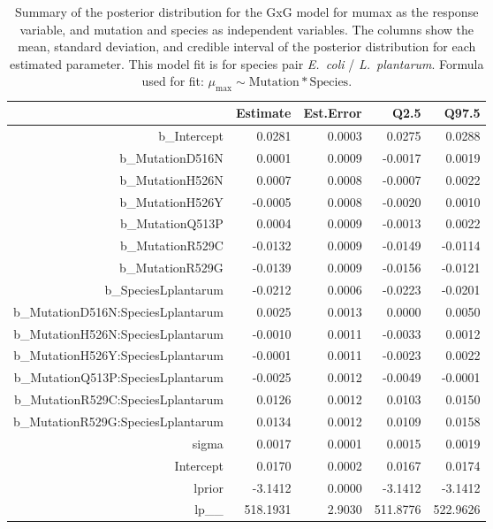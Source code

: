 \begin{table}[ht]
\centering
\begin{tabular}{rrrrr}
  \hline
 & Estimate & Est.Error & Q2.5 & Q97.5 \\ 
  \hline
b\_Intercept & 0.0281 & 0.0003 & 0.0275 & 0.0288 \\ 
  b\_MutationD516N & 0.0001 & 0.0009 & -0.0017 & 0.0019 \\ 
  b\_MutationH526N & 0.0007 & 0.0008 & -0.0007 & 0.0022 \\ 
  b\_MutationH526Y & -0.0005 & 0.0008 & -0.0020 & 0.0010 \\ 
  b\_MutationQ513P & 0.0004 & 0.0009 & -0.0013 & 0.0022 \\ 
  b\_MutationR529C & -0.0132 & 0.0009 & -0.0149 & -0.0114 \\ 
  b\_MutationR529G & -0.0139 & 0.0009 & -0.0156 & -0.0121 \\ 
  b\_SpeciesLplantarum & -0.0212 & 0.0006 & -0.0223 & -0.0201 \\ 
  b\_MutationD516N:SpeciesLplantarum & 0.0025 & 0.0013 & 0.0000 & 0.0050 \\ 
  b\_MutationH526N:SpeciesLplantarum & -0.0010 & 0.0011 & -0.0033 & 0.0012 \\ 
  b\_MutationH526Y:SpeciesLplantarum & -0.0001 & 0.0011 & -0.0023 & 0.0022 \\ 
  b\_MutationQ513P:SpeciesLplantarum & -0.0025 & 0.0012 & -0.0049 & -0.0001 \\ 
  b\_MutationR529C:SpeciesLplantarum & 0.0126 & 0.0012 & 0.0103 & 0.0150 \\ 
  b\_MutationR529G:SpeciesLplantarum & 0.0134 & 0.0012 & 0.0109 & 0.0158 \\ 
  sigma & 0.0017 & 0.0001 & 0.0015 & 0.0019 \\ 
  Intercept & 0.0170 & 0.0002 & 0.0167 & 0.0174 \\ 
  lprior & -3.1412 & 0.0000 & -3.1412 & -3.1412 \\ 
  lp\_\_ & 518.1931 & 2.9030 & 511.8776 & 522.9626 \\ 
   \hline
\end{tabular}
\caption{Summary of the posterior distribution for the GxG model for mumax as the response variable, and mutation and species as independent variables. The columns show the mean, standard deviation, and credible interval of the posterior distribution for each estimated parameter. This model fit is for species pair \textit{E.~coli} / \textit{L.~plantarum}.  Formula used for fit: $\mu_{\text{max}} \sim \text{Mutation} * \text{Species}$.} 
\label{supptab:GxG_mumax_EC_LP}
\end{table}




